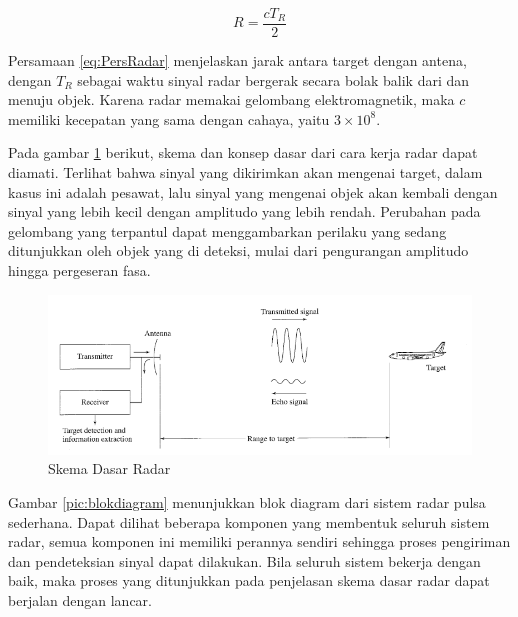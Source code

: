 \begin{equation}
	R = \frac{cT_{R}}{2}
	\label{eq:PersRadar}
\end{equation}

Persamaan \ref{eq:PersRadar} menjelaskan jarak antara target dengan antena, dengan $T_{R}$ sebagai waktu sinyal radar bergerak secara bolak balik dari dan menuju objek. Karena radar memakai gelombang elektromagnetik, maka $c$ memiliki kecepatan yang sama dengan cahaya, yaitu $3 \times 10 ^{8}$.

Pada gambar \ref{pic:skemaRadar} berikut, skema dan konsep dasar dari cara kerja radar dapat diamati. Terlihat bahwa sinyal yang dikirimkan akan mengenai target, dalam kasus ini adalah pesawat, lalu sinyal yang mengenai objek akan kembali dengan sinyal yang lebih kecil dengan amplitudo yang lebih rendah. Perubahan pada gelombang yang terpantul dapat menggambarkan perilaku yang sedang ditunjukkan oleh objek yang di deteksi, mulai dari pengurangan amplitudo hingga pergeseran fasa.

\begin{figure}
	\begin{center}
		\includegraphics[scale=0.5]{pics/bab2/skemaradar.png} 
		\caption[Skema Dasar Radar]{{Skema Dasar Radar} \cite{Skolnik2001}}
		\label{pic:skemaRadar}
	\end{center}
\end{figure}

Gambar \ref{pic:blokdiagram} menunjukkan blok diagram dari sistem radar pulsa sederhana. Dapat dilihat beberapa komponen yang membentuk seluruh sistem radar, semua komponen ini memiliki perannya sendiri sehingga proses pengiriman dan pendeteksian sinyal dapat dilakukan.  Bila seluruh sistem bekerja dengan baik, maka proses yang ditunjukkan pada penjelasan skema dasar radar dapat berjalan dengan lancar.

